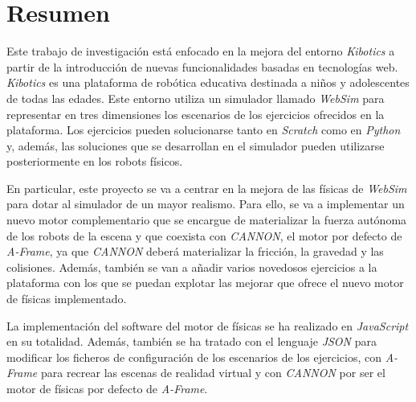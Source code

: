 \chapter*{Resumen}
Este trabajo de investigación está enfocado en la mejora del entorno \textit{Kibotics} a partir de la introducción de nuevas funcionalidades basadas en tecnologías web. \textit{Kibotics} es una plataforma de robótica educativa destinada a niños y adolescentes de todas las edades. Este entorno utiliza un simulador llamado \textit{WebSim} para representar en tres dimensiones los escenarios de los ejercicios ofrecidos en la plataforma. Los ejercicios pueden solucionarse tanto en \textit{Scratch} como en \textit{Python} y, además, las soluciones que se desarrollan en el simulador pueden utilizarse posteriormente en los robots físicos. \newline

En particular, este proyecto se va a centrar en la mejora de las físicas de \textit{WebSim} para dotar al simulador de un mayor realismo. Para ello, se va a implementar un nuevo motor complementario que se encargue de materializar la fuerza autónoma de los robots de la escena y que coexista con \textit{CANNON}, el motor por defecto de \textit{A-Frame}, ya que \textit{CANNON} deberá materializar la fricción, la gravedad y las colisiones. Además, también se van a añadir varios novedosos ejercicios a la plataforma con los que se puedan explotar las mejorar que ofrece el nuevo motor de físicas implementado. \newline

La implementación del software del motor de físicas se ha realizado en \textit{JavaScript} en su totalidad. Además, también se ha tratado con el lenguaje \textit{JSON} para modificar los ficheros de configuración de los escenarios de los ejercicios, con \textit{A-Frame} para recrear las escenas de realidad virtual y con \textit{CANNON} por ser el motor de físicas por defecto de \textit{A-Frame}.